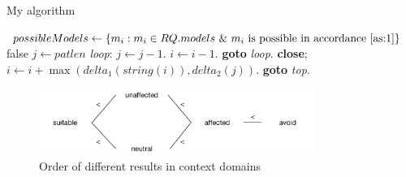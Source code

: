 \begin{algorithm}[h]
\caption{My algorithm}\label{lst:preferences_process}
\begin{algorithmic}[1]
\State $possibleModels \gets \{m_i : m_i \in RQ.models~\&~ m_i\text{ is possible in accordance \autoref{as:1}} \}$
 \Return false
\EndIf
\State $j \gets \textit{patlen}$
\State \emph{loop}:
\State $j \gets j-1$.
\State $i \gets i-1$.
\State \textbf{goto} \emph{loop}.
\State \textbf{close};
\EndIf
\State $i \gets i+\max(\textit{delta}_1(\textit{string}(i)),\textit{delta}_2(j))$.
\State \textbf{goto} \emph{top}.
\EndProcedure
\end{algorithmic}
\end{algorithm}

\begin{figure}[h]

\centering
\includegraphics[width=0.8\textwidth]{figures/order_context_domain}
\caption{Order of different results in context domains }
\end{figure}

